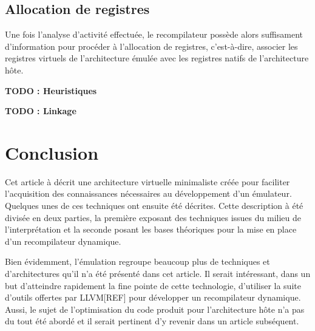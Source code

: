 \documentclass{article} %
\begin{document}
\subsection{Allocation de registres}
Une fois l'analyse d'activité effectuée, le recompilateur possède alors suffisament d'information pour procéder à l'allocation de registres, c'est-à-dire, associer les registres virtuels de l'architecture émulée avec les registres natifs de l'architecture hôte.

\textbf{TODO : Heuristiques}

\textbf{TODO : Linkage}

\section{Conclusion}
Cet article à décrit une architecture virtuelle minimaliste créée pour faciliter l'acquisition des connaissances nécessaires au développement d'un émulateur. Quelques unes de ces techniques ont ensuite été décrites. Cette description à été divisée en deux parties, la première exposant des techniques issues du milieu de l'interprétation et la seconde posant les bases théoriques pour la mise en place d'un recompilateur dynamique.

Bien évidemment, l'émulation regroupe beaucoup plus de techniques et d'architectures qu'il n'a été présenté dans cet article. Il serait intéressant, dans un but d'atteindre rapidement la fine pointe de cette technologie, d'utiliser la suite d'outils offertes par LLVM[REF] pour développer un recompilateur dynamique. Aussi, le sujet de l'optimisation du code produit pour l'architecture hôte n'a pas du tout été abordé et il serait pertinent d'y revenir dans un article subséquent.
\end{document}
